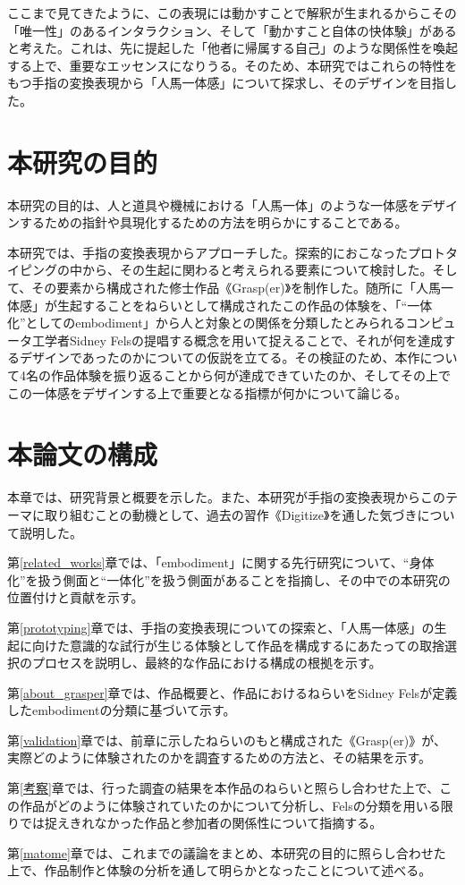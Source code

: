 ここまで見てきたように、この表現には動かすことで解釈が生まれるからこその「唯一性」のあるインタラクション、そして「動かすこと自体の快体験」があると考えた。これは、先に提起した「他者に帰属する自己」のような関係性を喚起する上で、重要なエッセンスになりうる。そのため、本研究ではこれらの特性をもつ手指の変換表現から「人馬一体感」について探求し、そのデザインを目指した。

\section{本研究の目的}

本研究の目的は、人と道具や機械における「人馬一体」のような一体感をデザインするための指針や具現化するための方法を明らかにすることである。

本研究では、手指の変換表現からアプローチした。探索的におこなったプロトタイピングの中から、その生起に関わると考えられる要素について検討した。そして、その要素から構成された修士作品《Grasp(er)》を制作した。随所に「人馬一体感」が生起することをねらいとして構成されたこの作品の体験を、「``一体化''としてのembodiment」から人と対象との関係を分類したとみられるコンピュータ工学者Sidney Felsの提唱する概念を用いて捉えることで、それが何を達成するデザインであったのかについての仮説を立てる。その検証のため、本作について4名の作品体験を振り返ることから何が達成できていたのか、そしてその上でこの一体感をデザインする上で重要となる指標が何かについて論じる。

\section{本論文の構成}
本章では、研究背景と概要を示した。また、本研究が手指の変換表現からこのテーマに取り組むことの動機として、過去の習作《Digitize》を通した気づきについて説明した。

第\ref{related_works}章では、「embodiment」に関する先行研究について、``身体化''を扱う側面と``一体化''を扱う側面があることを指摘し、その中での本研究の位置付けと貢献を示す。

第\ref{prototyping}章では、手指の変換表現についての探索と、「人馬一体感」の生起に向けた意識的な試行が生じる体験として作品を構成するにあたっての取捨選択のプロセスを説明し、最終的な作品における構成の根拠を示す。

第\ref{about_grasper}章では、作品概要と、作品におけるねらいをSidney Felsが定義したembodimentの分類に基づいて示す。

第\ref{validation}章では、前章に示したねらいのもと構成された《Grasp(er)》が、実際どのように体験されたのかを調査するための方法と、その結果を示す。

第\ref{考察}章では、行った調査の結果を本作品のねらいと照らし合わせた上で、この作品がどのように体験されていたのかについて分析し、Felsの分類を用いる限りでは捉えきれなかった作品と参加者の関係性について指摘する。

第\ref{matome}章では、これまでの議論をまとめ、本研究の目的に照らし合わせた上で、作品制作と体験の分析を通して明らかとなったことについて述べる。